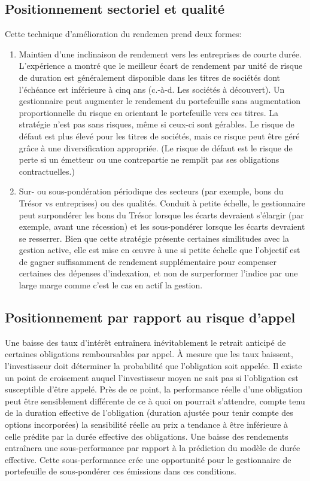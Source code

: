 \documentclass[12pt]{article}
\begin{document}
\subsection{Positionnement sectoriel et qualité}
Cette technique d'amélioration du rendemen prend deux formes:
\begin{enumerate}
\item Maintien d'une inclinaison de rendement vers les entreprises de courte durée. L'expérience a montré que le meilleur écart de rendement par unité de risque de duration est généralement disponible dans les titres de sociétés dont l'échéance est inférieure à cinq ans (c.-à-d. Les sociétés à découvert). Un gestionnaire peut augmenter le rendement du portefeuille sans augmentation proportionnelle du risque en orientant le portefeuille vers ces titres. La stratégie n'est pas sans risques, même si ceux-ci sont gérables. Le risque de défaut est plus élevé pour les titres de sociétés, mais ce risque peut être géré grâce à une diversification appropriée. (Le risque de défaut est le risque de perte si un émetteur ou une contrepartie ne remplit pas ses obligations contractuelles.)
\item Sur- ou sous-pondération périodique des secteurs (par exemple, bons du Trésor vs entreprises) ou des qualités. Conduit à petite échelle, le gestionnaire peut surpondérer les bons du Trésor lorsque les écarts devraient s'élargir (par exemple, avant une récession) et les sous-pondérer lorsque les écarts devraient se resserrer. Bien que cette stratégie présente certaines similitudes avec la gestion active, elle est mise en œuvre à une si petite échelle que l'objectif est de gagner suffisamment de rendement supplémentaire pour compenser certaines des dépenses d'indexation, et non de surperformer l'indice par une large marge comme c'est le cas en actif la gestion.
\end{enumerate}
\subsection{Positionnement par rapport au risque d'appel}
Une baisse des taux d'intérêt entraînera inévitablement le retrait anticipé de certaines obligations remboursables par appel. À mesure que les taux baissent, l'investisseur doit déterminer la probabilité que l'obligation soit appelée.  Il existe un point de croisement auquel l'investisseur moyen ne sait pas si l'obligation est susceptible d'être appelé. Près de ce point, la performance réelle d'une obligation peut être sensiblement différente de ce à quoi on pourrait s'attendre, compte tenu de la duration effective de l'obligation (duration ajustée pour tenir compte des options incorporées) la sensibilité réelle au prix a tendance à être inférieure à celle prédite par la durée effective des obligations. Une baisse des rendements entraînera une sous-performance par rapport à la prédiction du modèle de durée effective. Cette sous-performance crée une opportunité pour le gestionnaire de portefeuille de sous-pondérer ces émissions dans ces conditions.
\end{document}
